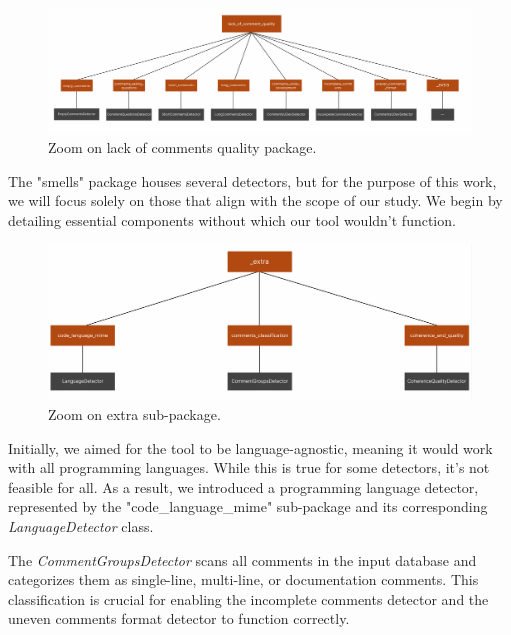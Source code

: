 \newpage
	
\begin{figure}[ht]
	\centering\includegraphics[width=465pt]{figs/zoom-cmsquality.PNG}
	\captionsetup{justification=centering}
	\caption{Zoom on lack of comments quality package.}
	\label{fig:zoom-cmsquality}
\end{figure}
	
\noindent The "smells" package houses several detectors, but for the purpose of this work, we will focus solely on those that align with the scope of our study. We begin by detailing essential components without which our tool wouldn't function.

\begin{figure}[ht]
	\centering\includegraphics[width=400pt]{figs/zoom-extra.PNG}
	\captionsetup{justification=centering}
	\caption{Zoom on extra sub-package.}
	\label{fig:zoom-extra}
\end{figure}

\noindent Initially, we aimed for the tool to be language-agnostic, meaning it would work with all programming languages. While this is true for some detectors, it’s not feasible for all. As a result, we introduced a programming language detector, represented by the "code\_language\_mime" sub-package and its corresponding \textit{LanguageDetector} class.

\noindent The \textit{CommentGroupsDetector} scans all comments in the input database and categorizes them as single-line, multi-line, or documentation comments. This classification is crucial for enabling the incomplete comments detector and the uneven comments format detector to function correctly.

